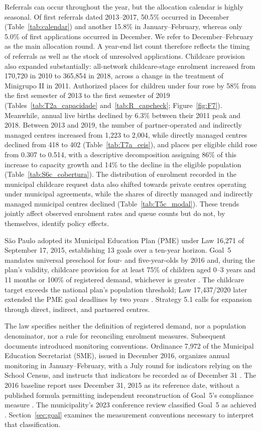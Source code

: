 Referrals can occur throughout the year, but the allocation calendar is highly seasonal. Of first referrals dated 2013--2017, 50.5\% occurred in December (Table~\ref{tab:calendar}) and another 15.8\% in January--February, whereas only 5.0\% of first applications occurred in December. We refer to December--February as the main allocation round. A year-end list count therefore reflects the timing of referrals as well as the stock of unresolved applications. Childcare provision also expanded substantially: all-network childcare-stage enrolment increased from 170,720 in 2010 to 365,854 in 2018, across a change in the treatment of Minigrupo II in 2011. Authorized places for children under four rose by 58\% from the first semester of 2013 to the first semester of 2019 (Tables~\ref{tab:T2a_capacidade} and~\ref{tab:R_capcheck}; Figure~\ref{fig:F7}). Meanwhile, annual live births declined by 6.3\% between their 2011 peak and 2018. Between 2013 and 2019, the number of partner-operated and indirectly managed centres increased from 1,223 to 2,004, while directly managed centres declined from 418 to 402 (Table~\ref{tab:T7a_ceis}), and places per eligible child rose from 0.307 to 0.514, with a descriptive decomposition assigning 86\% of this increase to capacity growth and 14\% to the decline in the eligible population (Table~\ref{tab:S6c_cobertura}). The distribution of enrolment recorded in the municipal childcare request data also shifted towards private centres operating under municipal agreements, while the shares of directly managed and indirectly managed municipal centres declined (Table~\ref{tab:T5c_modal}). These trends jointly affect observed enrolment rates and queue counts but do not, by themselves, identify policy effects.

S\~ao Paulo adopted its Municipal Education Plan (PME) under Law 16,271 of September 17, 2015, establishing 13 goals over a ten-year horizon. Goal~5 mandates universal preschool for four- and five-year-olds by 2016 and, during the plan's validity, childcare provision for at least 75\% of children aged 0--3 years and 11 months or 100\% of registered demand, whichever is greater \citep{saopaulo2015pme}. The childcare target exceeds the national plan's population threshold; Law 17,437/2020 later extended the PME goal deadlines by two years \citep{saopaulo2020lei17437}. Strategy 5.1 calls for expansion through direct, indirect, and partnered centres.

The law specifies neither the definition of registered demand, nor a population denominator, nor a rule for reconciling enrolment measures. Subsequent documents introduced monitoring conventions. Ordinance 7,972 of the Municipal Education Secretariat (SME), issued in December 2016, organizes annual monitoring in January--February, with a July round for indicators relying on the School Census, and instructs that indicators be recorded as of December 31 \citep{sme2016portaria7972}. The 2016 baseline report uses December 31, 2015 as its reference date, without a published formula permitting independent reconstruction of Goal~5's compliance measure \citep{sme2016linhabase}. The municipality's 2023 conference review classified Goal~5 as achieved \citep{saopaulo2023conferencia}. Section~\ref{sec:goal} examines the measurement conventions necessary to interpret that classification.
